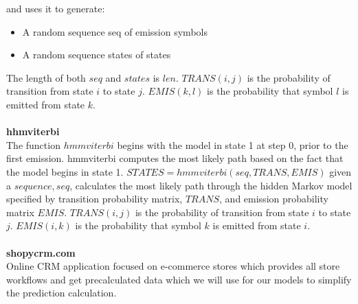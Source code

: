 and uses it to generate:\\
\begin{itemize}
    \item A random sequence seq of emission symbols
    \item A random sequence states of states
\end{itemize}
The length of both $seq$ and $states$ is $len$.
$TRANS(i,j)$ is the probability of transition from state $i$ to state $j$.
$EMIS(k,l)$ is the probability that symbol $l$ is emitted from state $k$.\\
\\
\textbf{hhmviterbi}~\cite{hhmviterbi}\\
The function $hmmviterbi$ begins with the model in state 1 at step 0, prior to the first emission.
hmmviterbi computes the most likely path based on the fact that the model begins in state 1.
$STATES = hmmviterbi(seq,TRANS,EMIS)$ given a $sequence, seq$, calculates the most likely path through the hidden Markov model
specified by transition probability matrix, $TRANS$, and emission probability matrix $EMIS$. $TRANS(i,j)$ is the probability of transition from state $i$ to state $j$.
$EMIS(i,k)$ is the probability that symbol $k$ is emitted from state $i$.\\
\\
\textbf{shopycrm.com}\\
Online CRM application focused on e-commerce stores which provides all store workflows and get precalculated data which we will use for our models to simplify the prediction calculation.
\newpage

